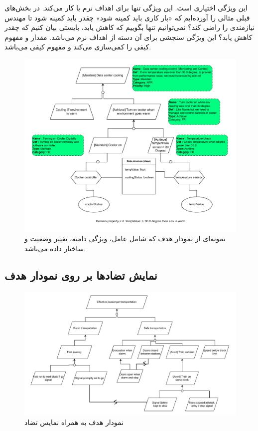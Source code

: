 این ویژگی اختیاری است. این ویژگی تنها برای اهداف نرم یا  کار
می‌کند. در بخش‌های قبلی مثالی را آورده‌ایم که «بار کاری باید کمینه شود» چقدر
باید کمینه شود تا مهندس نیازمندی را راضی کند؟ نمی‌توانیم تنها بگوییم که کاهش
یابد، بایستی بیان کنیم که چقدر کاهش یابد؟ این ویژگی سنجشی برای آن دسته از اهداف
نرم می‌باشد. مقدار و مفهوم کیفی را کمی‌سازی می‌کند و مفهوم کیفی 
می‌باشد.

\begin{figure}[H]
    \centering
    \includegraphics[width=1\textwidth]{assets/exp_1.drawio.pdf}
    \caption{نمونه‌ای از نمودار هدف که شامل عامل، ویژگی دامنه، تغییر وضعیت و
    ساختار داده می‌باشد.}
\end{figure}

\subsection{نمایش تضاد‌ها بر روی نمودار هدف}

\begin{figure}[H]
    \centering
    \includegraphics[width=1\textwidth]{assets/goal_diagram_with_high_conflict.drawio.pdf}
    \caption{نمودار هدف به همراه نمایس تضاد}
\end{figure}

